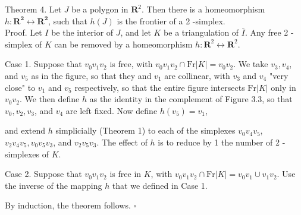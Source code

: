 Theorem 4. Let $J$ be a polygon in $\mathbf{R}^{2}$. Then there is a homeomorphism $h: \mathbf{R}^{\mathbf{2}} \leftrightarrow \mathbf{R}^{\mathbf{2}}$, such that $h(J)$ is the frontier of a 2 -simplex.\\
Proof. Let $I$ be the interior of $J$, and let $K$ be a triangulation of $\bar{I}$. Any free 2 -simplex of $K$ can be removed by a homeomorphism $h: \mathbf{R}^{2} \leftrightarrow \mathbf{R}^{2}$.

Case 1. Suppose that $v_{0} v_{1} v_{2}$ is free, with $v_{0} v_{1} v_{2} \cap \mathrm{Fr}|K|=v_{0} v_{2}$. We take $v_{3}, v_{4}$, and $v_{5}$ as in the figure, so that they and $v_{1}$ are collinear, with $v_{3}$ and $v_{4}$ "very close" to $v_{1}$ and $v_{5}$ respectively, so that the entire figure intersects $\mathrm{Fr}|K|$ only in $v_{0} v_{2}$. We then define $h$ as the identity in the complement of Figure 3.3, so that $v_{0}, v_{2}, v_{3}$, and $v_{4}$ are left fixed. Now define $h\left(v_{5}\right)=v_{1}$,

\begin{center}
\end{center}


and extend $h$ simplicially (Theorem 1) to each of the simplexes $v_{0} v_{4} v_{5}$, $v_{2} v_{4} v_{5}, v_{0} v_{5} v_{3}$, and $v_{2} v_{5} v_{3}$. The effect of $h$ is to reduce by 1 the number of 2 -simplexes of $K$.

Case 2. Suppose that $v_{0} v_{1} v_{2}$ is free in $K$, with $v_{0} v_{1} v_{2} \cap \mathrm{Fr}|K|=v_{0} v_{1} \cup v_{1} v_{2}$. Use the inverse of the mapping $h$ that we defined in Case 1.

By induction, the theorem follows. \(\square\)
